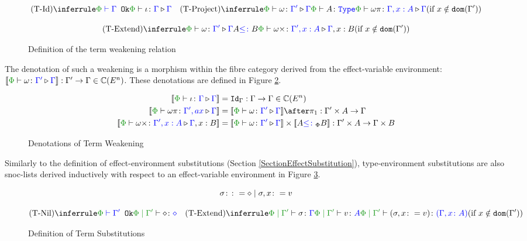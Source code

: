\documentclass{Report}
\begin{document}
\begin{figure}[H]
    \centering
    \begin{framed}
        \[
            \ntreeruleI{\tid}{\wellformedok{\P}{\G}}{\pewrel{\i}{\G}{\G}}
            \quad  
            \condtreeruleII{\tproject}{\pewrel{\w}{\G'}{\G}}{\typerelation{\P}{A}{\type}}{\pewrel{\w \pi}{\G, x: A}{\G}}{x \notin \dom{\G'}}
        \]
        
        \[
            \condtreeruleII{\textend}{\pewrel{\w}{\G'}{\G}}{ A \subtype B}{\pewrel{\w \x}{\G', x: A}{\G, x: B}}{x \notin \dom{\G'}}
        \] 
    \end{framed}
    \caption{Definition of the term weakening relation}
    \label{TermWeakeningRelation}
\end{figure}


The denotation of such a weakening is a morphism within the fibre category derived from the effect-variable environment: $\deno{\pewrel{\w}{\G'}{\G}}: \G' \rightarrow \G \in \C(E^n)$. These denotations are defined in Figure \ref{TermWeakeningDenotations}.

\begin{figure}[H]
    \centering
    \begin{framed}
        \begin{align}
            \deno{\pewrel{\i}{\G}{\G}} &= \idg: \G \rightarrow \G \in \C(E^n)
            \\
            \deno{\pewrel{\w\pi}{\G', ax}{\G}} &= \deno{\pewrel{\w}{\G'}{\G}}\after\p: \G'\times A \rightarrow \G
            \\
            \deno{\pewrel{\w\x}{\G', x: A}{\G, x: B}} &= \deno{\pewrel{\w}{\G'}{\G}}\times \deno{A\subtypep B}: \G'\times A \rightarrow \G\times B
        \end{align}
        
    \end{framed}\caption{Denotations of Term Weakening}
    \label{TermWeakeningDenotations}
\end{figure}


Similarly to the definition of effect-environment substitutions (Section \ref{SectionEffectSubstitution}), type-environment substitutions are also snoc-lists derived inductively with respect to an effect-variable environment in Figure \ref{TermSubstitutionDefinition}.

\begin{figure}[H]
    \centering
\begin{framed}
    
    \[
        \sigma\colon\colon=\diamond\mid\sigma,x\colon= v    
    \]

    \[
    \ntreeruleI{\tsubnil}{\wellformedok{\P}{\G'}}{\etyperelation{\P}{\G'}{\nil}{\nil}}
    \quad
    \condtreeruleII{\tsubextend}{
        \etyperelation{\P}{\G'}{\si}{\G}
    }{
        \etyperelation{\P}{\G'}{v}{A}
    }{
        \etyperelation{\P}{\G'}{(\si, x \setto v)}{(\gax)}
    }{x \notin \dom{\G'}}
\]
\end{framed}
    \caption{Definition of Term Substitutions}
    \label{TermSubstitutionDefinition}
\end{figure}
\end{document}
